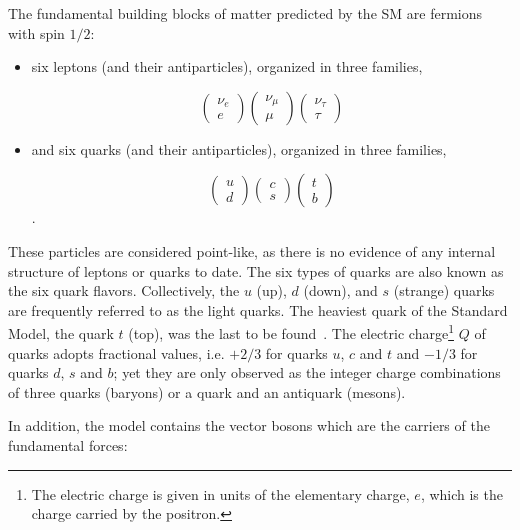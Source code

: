 The fundamental building blocks of matter predicted by the SM are fermions with spin $1/2$:

\begin{itemize}\addtolength{\itemsep}{-0.4\baselineskip}
\item
six leptons (and their antiparticles), organized in three families, 

\[ \left( \begin{array}{c} \nu_e \\ e \end{array} \right)  \left( \begin{array}{c} \nu_{\mu} \\ \mu \end{array} \right)   \left( \begin{array}{c} \nu_{\tau} \\ \tau \end{array} \right)     \]


\item
and six quarks (and their antiparticles), organized in three families,

\[ \left( \begin{array}{c} u \\ d \end{array} \right)  \left( \begin{array}{c} c \\ s \end{array} \right)   \left( \begin{array}{c} t \\ b \end{array} \right)     \].
\end{itemize}
These particles are considered point-like, as there is no evidence of any internal structure of leptons or quarks to date. The six types of quarks are also known as the six quark flavors. Collectively, the $u$ (up), $d$ (down), and $s$ (strange) quarks are frequently referred to as the light quarks. The heaviest quark of the Standard Model, the quark $t$ (top), was the last to be found~\cite{PhysRevLett.74.2626,PhysRevLett.74.2422}.  The electric charge\footnote{The electric charge is given in units of the elementary charge, $e$, which is the charge carried by the positron.} $Q$ of quarks adopts fractional values, i.e. $+2/3$ for quarks $u$, $c$ and $t$ and $-1/3$ for quarks $d$, $s$ and $b$; yet they are only observed as the integer charge combinations of three quarks (baryons) or a quark and an antiquark (mesons).

In addition, the model contains the vector bosons which are the carriers of the fundamental forces:

